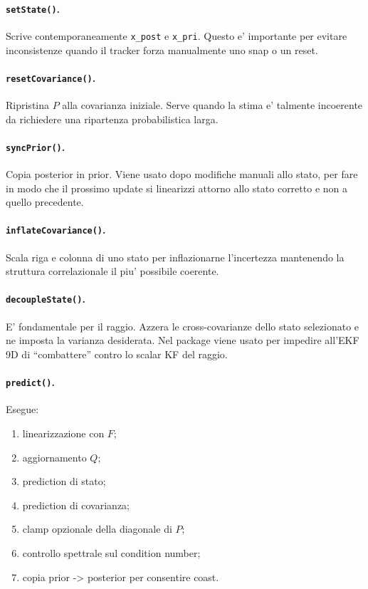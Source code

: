 \documentclass[11pt,a4paper]{article}
\newcommand{\code}[1]{\texttt{#1}}
\begin{document}
\paragraph{\code{setState()}.}
Scrive contemporaneamente \code{x\_post} e \code{x\_pri}. Questo e' importante per evitare inconsistenze quando il tracker forza manualmente uno snap o un reset.

\paragraph{\code{resetCovariance()}.}
Ripristina \(P\) alla covarianza iniziale. Serve quando la stima e' talmente incoerente da richiedere una ripartenza probabilistica larga.

\paragraph{\code{syncPrior()}.}
Copia posterior in prior. Viene usato dopo modifiche manuali allo stato, per fare in modo che il prossimo update si linearizzi attorno allo stato corretto e non a quello precedente.

\paragraph{\code{inflateCovariance()}.}
Scala riga e colonna di uno stato per inflazionarne l'incertezza mantenendo la struttura correlazionale il piu' possibile coerente.

\paragraph{\code{decoupleState()}.}
E' fondamentale per il raggio. Azzera le cross-covarianze dello stato selezionato e ne imposta la varianza desiderata. Nel package viene usato per impedire all'EKF 9D di ``combattere'' contro lo scalar KF del raggio.

\paragraph{\code{predict()}.}
Esegue:
\begin{enumerate}[leftmargin=1.4em]
  \item linearizzazione con \(F\);
  \item aggiornamento \(Q\);
  \item prediction di stato;
  \item prediction di covarianza;
  \item clamp opzionale della diagonale di \(P\);
  \item controllo spettrale sul condition number;
  \item copia prior -> posterior per consentire coast.
\end{enumerate}
\end{document}
